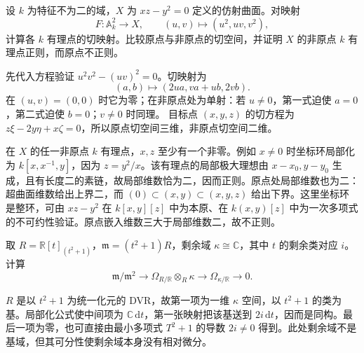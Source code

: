 \begin{exercise}\label{g5:ex:quadratic-cone-tangent-map}
	设 \(k\) 为特征不为二的域，\(X\) 为 \(xz-y^2=0\) 定义的仿射曲面。对映射
	\[
		F:\mathbb A_k^2\longrightarrow X,\qquad
		(u,v)\longmapsto(u^2,uv,v^2),
	\]
	计算各 \(k\) 有理点的切映射。比较原点与非原点的切空间，并证明 \(X\) 的非原点 \(k\) 有理点正则，而原点不正则。
\end{exercise}
\begin{solution}
	先代入方程验证 \(u^2v^2-(uv)^2=0\)。切映射为
	\[
		(a,b)\longmapsto(2ua,va+ub,2vb).
	\]
	在 \((u,v)=(0,0)\) 时它为零；在非原点处为单射：若 \(u\ne0\)，第一式迫使 \(a=0\)，第二式迫使 \(b=0\)；\(v\ne0\) 时同理。
	目标点 \((x,y,z)\) 的切方程为 \(z\xi-2y\eta+x\zeta=0\)，所以原点切空间三维，非原点切空间二维。

	在 \(X\) 的任一非原点 \(k\) 有理点，\(x,z\) 至少有一个非零。例如 \(x\ne0\) 时坐标环局部化为 \(k[x,x^{-1},y]\)，因为 \(z=y^2/x\)。该有理点的局部极大理想由 \(x-x_0,y-y_0\) 生成，且有长度二的素链，故局部维数恰为二，因而正则。原点处局部维数也为二：超曲面维数给出上界二，而
	\((0)\subset(x,y)\subset(x,y,z)\) 给出下界。这里坐标环是整环，可由 \(xz-y^2\) 在 \(k[x,y][z]\) 中为本原、在 \(k(x,y)[z]\) 中为一次多项式的不可约性验证。原点嵌入维数三大于局部维数二，故不正则。
\end{solution}

\begin{exercise}\label{g5:ex:nonrational-separable-cotangent}
	取 \(R=\mathbb R[t]_{(t^2+1)}\)，\(\mathfrak m=(t^2+1)R\)，剩余域 \(\kappa\cong\mathbb C\)，其中 \(t\) 的剩余类对应 \(i\)。计算
	\[
		\mathfrak m/\mathfrak m^2
		\longrightarrow\Omega_{R/\mathbb R}\otimes_R\kappa
		\longrightarrow\Omega_{\kappa/\mathbb R}\longrightarrow0.
	\]
\end{exercise}
\begin{solution}
	\(R\) 是以 \(t^2+1\) 为统一化元的 DVR，故第一项为一维 \(\kappa\) 空间，以 \(t^2+1\) 的类为基。局部化公式使中间项为 \(\mathbb C\,\mathrm{d}t\)，第一张映射把该基送到 \(2i\,\mathrm{d}t\)，因而是同构。最后一项为零，也可直接由最小多项式 \(T^2+1\) 的导数 \(2i\ne0\) 得到。此处剩余域不是基域，但其可分性使剩余域本身没有相对微分。
\end{solution}

